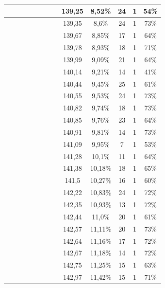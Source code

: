 \begin{center}
\begin{longtable}{|c|c|c|c|c|c|c|c|c|c|c|c|c|}
 \x &  \x &  &  &  &  &  &  \x & 139,25 & 8,52\% & 24 & 1 & 54\% \\ \hline
 \x &  \x &  &  &  &  \x &  &  & 139,35 & 8,6\% & 24 & 1 & 73\% \\ \hline
 \x &  \x &  \x &  &  &  &  &  & 139,67 & 8,85\% & 17 & 1 & 64\% \\ \hline
 \x &  &  \x &  &  \x &  \x &  &  \x & 139,78 & 8,93\% & 18 & 1 & 71\% \\ \hline
 \x &  \x &  \x &  \x &  &  &  &  & 139,99 & 9,09\% & 21 & 1 & 64\% \\ \hline
 \x &  &  &  &  &  &  &  \x & 140,14 & 9,21\% & 14 & 1 & 41\% \\ \hline
 \x &  &  &  &  \x &  &  &  \x & 140,44 & 9,45\% & 25 & 1 & 61\% \\ \hline
 \x &  &  &  \x &  &  \x &  &  & 140,55 & 9,53\% & 24 & 1 & 73\% \\ \hline
 \x &  &  \x &  &  &  \x &  &  & 140,82 & 9,74\% & 18 & 1 & 73\% \\ \hline
 \x &  \x &  \x &  &  &  &  &  \x & 140,85 & 9,76\% & 23 & 1 & 64\% \\ \hline
 \x &  \x &  \x &  \x &  &  \x &  &  \x & 140,91 & 9,81\% & 14 & 1 & 73\% \\ \hline
 \x &  \x &  &  &  &  &  &  & 141,09 & 9,95\% & 7 & 1 & 53\% \\ \hline
 \x &  &  \x &  &  &  &  &  \x & 141,28 & 10,1\% & 11 & 1 & 64\% \\ \hline
 \x &  &  \x &  &  \x &  &  &  \x & 141,38 & 10,18\% & 18 & 1 & 65\% \\ \hline
 \x &  &  &  &  \x &  &  &  & 141,5 & 10,27\% & 16 & 1 & 60\% \\ \hline
 \x &  &  &  &  \x &  \x &  &  & 142,22 & 10,83\% & 24 & 1 & 72\% \\ \hline
 \x &  \x &  \x &  \x &  &  \x &  \x &  \x & 142,35 & 10,93\% & 13 & 1 & 72\% \\ \hline
 \x &  \x &  &  \x &  \x &  &  &  \x & 142,44 & 11,0\% & 20 & 1 & 61\% \\ \hline
 \x &  \x &  \x &  &  &  \x &  \x &  \x & 142,57 & 11,11\% & 20 & 1 & 73\% \\ \hline
 \x &  \x &  &  \x &  &  \x &  &  \x & 142,64 & 11,16\% & 17 & 1 & 72\% \\ \hline
 \x &  &  \x &  &  &  \x &  &  \x & 142,67 & 11,18\% & 14 & 1 & 72\% \\ \hline
 \x &  \x &  \x &  &  \x &  &  &  & 142,75 & 11,25\% & 15 & 1 & 63\% \\ \hline
 \x &  &  \x &  \x &  \x &  \x &  &  \x & 142,97 & 11,42\% & 15 & 1 & 71\% \\ \hline

\end{longtable}
\end{center}
